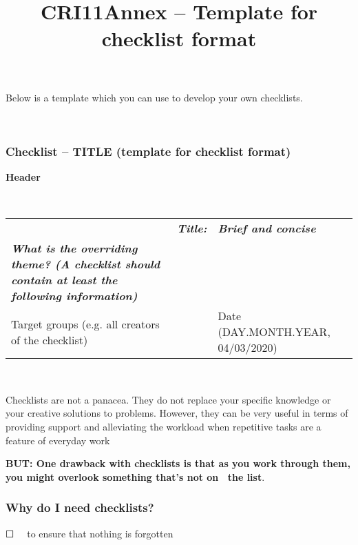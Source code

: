 \documentclass{article}
\begin{document}
\title{CRI11Annex – Template for checklist format}

\maketitle





Below is a template which you can use to develop your own checklists.


 


\subsubsection{Checklist – TITLE (template for checklist format)}\label{H9231130}



\textbf{Header}


 


\begin{tabu} to \textwidth { |X|X|X| }
\hline



 & \emph{\textbf{Title:}} & \emph{\textbf{Brief and concise}}
 \\


\emph{\textbf{What is the overriding theme? (A checklist should contain at least the following information)}} &   &  
 \\


Target groups (e.g. all creators of the checklist) &   & Date (DAY.MONTH.YEAR, 04/03/2020)
 \\
\hline

\end{tabu}

 


Checklists are not a panacea. They do not replace your specific knowledge or your creative solutions to problems. However, they can be very useful in terms of providing support and alleviating the workload when repetitive tasks are a feature of everyday work 


\textbf{BUT: One drawback with checklists is that as you work through them, you might overlook something that's not on  the list}.


\subsubsection{Why do I need checklists?}\label{H1070827}



☐   to ensure that nothing is forgotten
\end{document}
